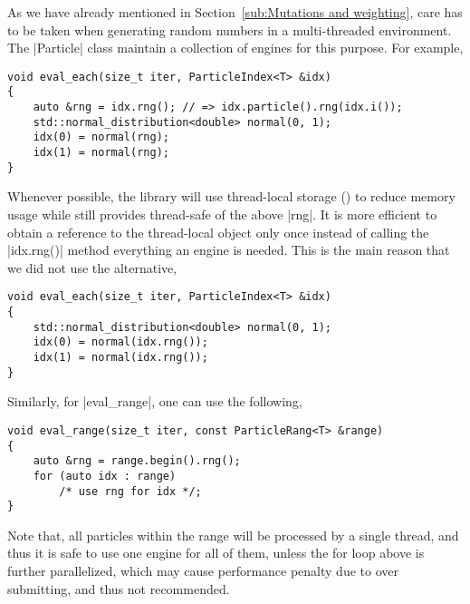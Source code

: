 As we have already mentioned in Section~\ref{sub:Mutations and weighting}, care
has to be taken when generating random numbers in a multi-threaded environment.
The |Particle| class maintain a collection of \rng engines for this purpose.
For example,
\begin{Verbatim}
void eval_each(size_t iter, ParticleIndex<T> &idx)
{
    auto &rng = idx.rng(); // => idx.particle().rng(idx.i());
    std::normal_distribution<double> normal(0, 1);
    idx(0) = normal(rng);
    idx(1) = normal(rng);
}
\end{Verbatim}
Whenever possible, the library will use thread-local storage (\tls) to reduce
memory usage while still provides thread-safe of the above |rng|. It is more
efficient to obtain a reference to the thread-local object only once instead of
calling the |idx.rng()| method everything an \rng engine is needed. This is the
main reason that we did not use the alternative,
\begin{Verbatim}
void eval_each(size_t iter, ParticleIndex<T> &idx)
{
    std::normal_distribution<double> normal(0, 1);
    idx(0) = normal(idx.rng());
    idx(1) = normal(idx.rng());
}
\end{Verbatim}
Similarly, for |eval_range|, one can use the following,
\begin{Verbatim}
void eval_range(size_t iter, const ParticleRang<T> &range)
{
    auto &rng = range.begin().rng();
    for (auto idx : range)
        /* use rng for idx */;
}
\end{Verbatim}
Note that, all particles within the range will be processed by a single thread,
and thus it is safe to use one \rng engine for all of them, unless the for loop
above is further parallelized, which may cause performance penalty due to over
submitting, and thus not recommended.
